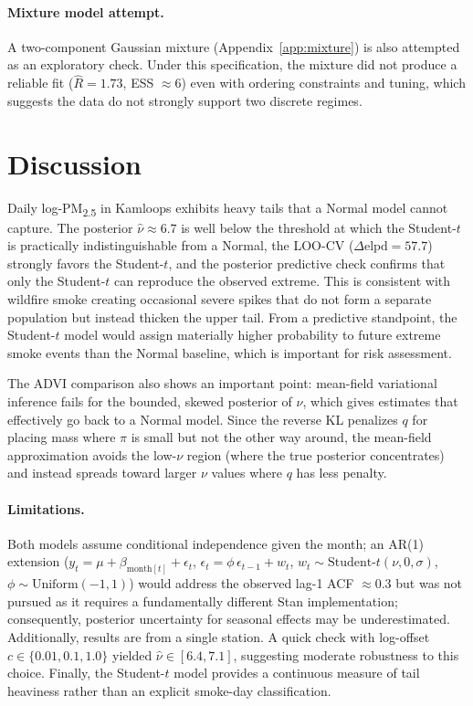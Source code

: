 \documentclass[10pt]{article}
\begin{document}
\paragraph{Mixture model attempt.} A two-component Gaussian mixture (Appendix~\ref{app:mixture}) is also attempted as an exploratory check. Under this specification, the mixture did not produce a reliable fit ($\hat{R} = 1.73$, ESS $\approx 6$) even with ordering constraints and tuning, which suggests the data do not strongly support two discrete regimes.


\section{Discussion}\label{sec:discussion}

Daily log-PM\textsubscript{2.5} in Kamloops exhibits heavy tails that a Normal model cannot capture. The posterior $\hat{\nu} \approx 6.7$ is well below the threshold at which the Student-$t$ is practically indistinguishable from a Normal, the LOO-CV ($\Delta\text{elpd} = 57.7$) strongly favors the Student-$t$, and the posterior predictive check confirms that only the Student-$t$ can reproduce the observed extreme. This is consistent with wildfire smoke creating occasional severe spikes that do not form a separate population but instead thicken the upper tail. From a predictive standpoint, the Student-$t$ model would assign materially higher probability to future extreme smoke events than the Normal baseline, which is important for risk assessment.

The ADVI comparison also shows an important point: mean-field variational inference fails for the bounded, skewed posterior of $\nu$, which gives estimates that effectively go back to a Normal model. Since the reverse KL penalizes $q$ for placing mass where $\pi$ is small but not the other way around, the mean-field approximation avoids the low-$\nu$ region (where the true posterior concentrates) and instead spreads toward larger $\nu$ values where $q$ has less penalty.

\paragraph{Limitations.} Both models assume conditional independence given the month; an AR(1) extension ($y_t = \mu + \beta_{\text{month}[t]} + \epsilon_t$, \; $\epsilon_t = \phi\,\epsilon_{t-1} + w_t$, \; $w_t \sim \text{Student-}t(\nu,0,\sigma)$, \; $\phi \sim \text{Uniform}(-1,1)$) would address the observed lag-1 ACF $\approx 0.3$ but was not pursued as it requires a fundamentally different Stan implementation; consequently, posterior uncertainty for seasonal effects may be underestimated. Additionally, results are from a single station. A quick check with log-offset $c \in \{0.01, 0.1, 1.0\}$ yielded $\hat{\nu} \in [6.4, 7.1]$, suggesting moderate robustness to this choice. Finally, the Student-$t$ model provides a continuous measure of tail heaviness rather than an explicit smoke-day classification.
\end{document}
